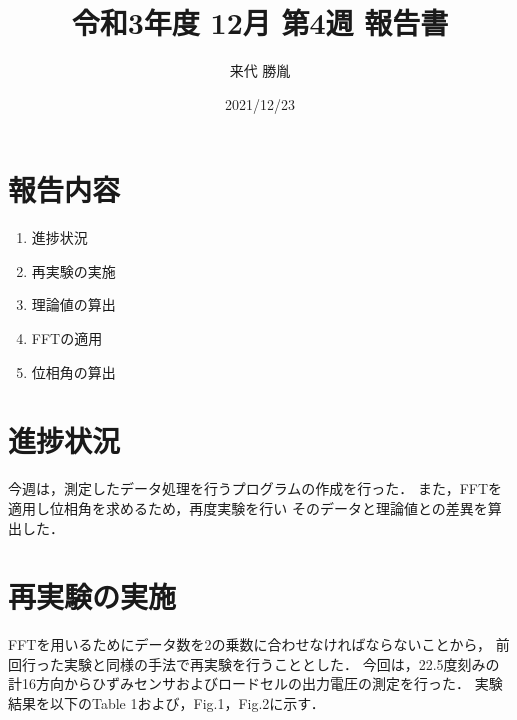 \documentclass[twocolumn,a4j]{jsarticle}
\author{来代 勝胤}
\title{令和3年度 12月 第4週 報告書}
\date{2021/12/23}
\begin{document}
\columnseprule=0.1mm

\maketitle
\section*{報告内容}
\begin{enumerate}[1.]
    \item 進捗状況
    \item 再実験の実施
    \item 理論値の算出
    \item FFTの適用
    \item 位相角の算出
\end{enumerate}

\section{進捗状況}
今週は，測定したデータ処理を行うプログラムの作成を行った．
また，FFTを適用し位相角を求めるため，再度実験を行い
そのデータと理論値との差異を算出した．

\section{再実験の実施}
FFTを用いるためにデータ数を2の乗数に合わせなければならないことから，
前回行った実験と同様の手法で再実験を行うこととした．
今回は，22.5度刻みの計16方向からひずみセンサおよびロードセルの出力電圧の測定を行った．
実験結果を以下のTable 1および，Fig.1，Fig.2に示す．\\
\end{document}

